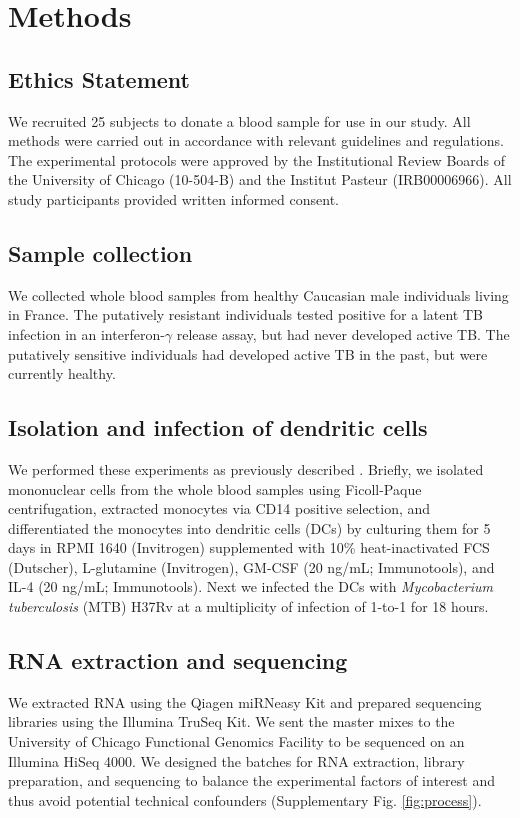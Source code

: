 \documentclass[fleqn,10pt]{wlscirep}
\begin{document}
\section*{Methods}

\subsection*{Ethics Statement}

We recruited 25 subjects to donate a blood sample for use in our
study. All methods were carried out in accordance with relevant
guidelines and regulations. The experimental protocols were approved
by the Institutional Review Boards of the University of Chicago
(10-504-B) and the Institut Pasteur (IRB00006966). All study
participants provided written informed consent.
\subsection*{Sample collection}

We collected whole blood samples from healthy Caucasian male
individuals living in France. The putatively resistant individuals
tested positive for a latent TB infection in an interferon-$\gamma$
release assay, but had never developed active TB. The putatively
sensitive individuals had developed active TB in the past, but were
currently healthy.
\subsection*{Isolation and infection of dendritic cells}

We performed these experiments as previously described
\cite{Barreiro2012}. Briefly, we isolated mononuclear cells from the
whole blood samples using Ficoll-Paque centrifugation, extracted
monocytes via CD14 positive selection, and differentiated the
monocytes into dendritic cells (DCs) by culturing them for 5 days in
RPMI 1640 (Invitrogen) supplemented with 10\% heat-inactivated FCS
(Dutscher), L-glutamine (Invitrogen), GM-CSF (20 ng/mL; Immunotools),
and IL-4 (20 ng/mL; Immunotools). Next we infected the DCs with
\emph{Mycobacterium tuberculosis} (MTB) H37Rv at a multiplicity of
infection of 1-to-1 for 18 hours.
\subsection*{RNA extraction and sequencing}

We extracted RNA using the Qiagen miRNeasy Kit and prepared sequencing
libraries using the Illumina TruSeq Kit. We sent the master mixes to
the University of Chicago Functional Genomics Facility to be sequenced
on an Illumina HiSeq 4000. We designed the batches for RNA extraction,
library preparation, and sequencing to balance the experimental
factors of interest and thus avoid potential technical confounders
(Supplementary Fig. \ref{fig:process}).
\end{document}
